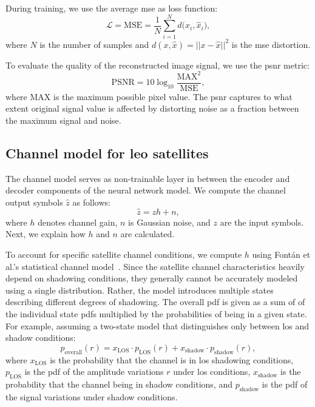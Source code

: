 \documentclass[conference]{IEEEtran}
\begin{document}
During training, we use the average \ac{mse} as loss function:
%
\begin{equation}
  \mathcal{L} = \mathrm{MSE} = \frac{1}{N} \sum_{i=1}^{N} d \bigl(x_i, \hat{x}_i\bigr),
\end{equation}
where $N$ is the number of samples and $d(x, \hat{x}) = || x - \hat{x} ||^2$ is the \ac{mse} distortion.

To evaluate the quality of the reconstructed image signal, we use the \ac{psnr} metric:
%
\begin{equation}
  \mathrm{PSNR} = 10 \log_{10}\frac{\mathrm{MAX}^2}{\mathrm{MSE}},
\end{equation}
%
where $\mathrm{MAX}$ is the maximum possible pixel value.
The \ac{psnr} captures to what extent original signal value is affected by distorting noise as a fraction between the maximum signal and noise.


\subsection{Channel model for \ac{leo} satellites}
\label{sub:channel_model}

The channel model serves as non-trainable layer in between the encoder and decoder components of the neural network model.
We compute the channel output symbols $\hat{z}$ as follows:
\begin{equation}
  \hat{z} = zh + n,
\end{equation}
where $h$ denotes channel gain, $n$ is Gaussian noise, and $z$ are the input symbols.
Next, we explain how $h$ and $n$ are calculated.

To account for specific satellite channel conditions, we compute $h$ using Fontán et al.'s statistical channel model~\cite{966585}. 
Since the satellite channel characteristics heavily depend on shadowing conditions, 
they generally cannot be accurately modeled using a single distribution.
Rather, the model introduces multiple states describing different degrees of shadowing. 
The overall \ac{pdf} is given as a sum of of the individual state \acp{pdf} multiplied by the probabilities of being in a given state.
For example, assuming a two-state model that distinguishes only between \ac{los} and shadow conditions: 
%
\begin{equation}
p_{\mathrm{overall}}(r) = x_{\mathrm{LOS}} \cdot p_{\mathrm{LOS}}(r)
  + x_{\mathrm{shadow}} \cdot p_{\mathrm{shadow}}(r),
\end{equation}
%
where $x_{\mathrm{LOS}}$ is the probability that the channel is in \ac{los} shadowing conditions, $p_{\mathrm{LOS}}$ is the \ac{pdf} of the amplitude variations $r$ under \ac{los} conditions, $x_{\mathrm{shadow}}$ is the probability that the channel being in shadow conditions, and $p_{\mathrm{shadow}}$ is the \ac{pdf} of the signal variations under shadow conditions.
\end{document}
